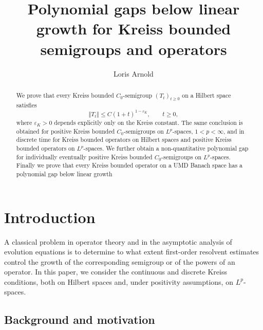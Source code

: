 \documentclass[12pt]{amsart}
\theoremstyle{plain}
\theoremstyle{remark}
\theoremstyle{definition}
\newcommand{\norm}[1]{\left\Vert #1\right\Vert}
\begin{document}
	
	\title[Polynomial gaps for Kreiss bounded semigroups and operators]
	{Polynomial gaps below linear growth for Kreiss bounded semigroups and operators}
	\author[L. Arnold]{Loris Arnold}
	
	
	\address[L. Arnold]{Normandie Univ, UNICAEN, CNRS, LMNO, 14000 Caen, France}
	
	\begin{abstract} We prove that every Kreiss bounded $C_0$-semigroup $(T_t)_{t\ge0}$ on a Hilbert space satisfies \[ \norm{T_t}\le C(1+t)^{1-\varepsilon_K}, \qquad t\ge0, \] where $\varepsilon_K>0$ depends explicitly only on the Kreiss constant. The same conclusion is obtained for positive Kreiss bounded $C_0$-semigroups on $L^p$-spaces, $1<p<\infty$, and in discrete time for Kreiss bounded operators on Hilbert spaces and positive Kreiss bounded operators on $L^p$-spaces. We further obtain a non-quantitative polynomial gap for individually eventually positive Kreiss bounded $C_0$-semigroups on $L^p$-spaces. Finally we prove that every Kreiss bounded operator on a UMD Banach space has a polynomial gap below linear growth\end{abstract}
	\maketitle
	
	
	
	\section{Introduction}
	
	A classical problem in operator theory and in the asymptotic analysis of evolution equations is to determine to what extent first-order resolvent estimates control the growth of the corresponding semigroup or of the powers of an operator. In this paper, we consider the continuous and discrete Kreiss conditions, both on Hilbert spaces and, under positivity assumptions, on $L^p$-spaces.
	
	\subsection*{Background and motivation}
	
\end{document}
